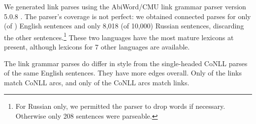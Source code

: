 \documentclass[11pt]{article}
\newcommand{\Note}[4][]{\todo[author=#2,color=#3,fancyline,#1]{#4}}
\newcommand{\noteJE}[2][]{\Note[#1]{JE}{green!40}{#2}}
\newcommand{\NoteJE}[2][]{\noteJE[inline,#1]{#2}}
\begin{document}
We generated link parses using the AbiWord/CMU link grammar parser version 5.0.8 \cite{LINKPARSER-2014}.  The parser's coverage is not perfect: we obtained connected parses for only (of $\!\!$) English sentences and only 8,018 (of 10,000) Russian sentences, discarding the other sentences.\footnote{For Russian only, we permitted the parser to drop words if necessary.  Otherwise only 208 sentences were parseable.}
These two languages have the most mature lexicons at present, although lexicons for 7 other languages are available.  

The link grammar parses do differ in style from the single-headed CoNLL parses of the same English sentences.  They have more edges overall.  Only of the links match CoNLL arcs, and only of the CoNLL arcs match links.
%   
% 





\end{document}
